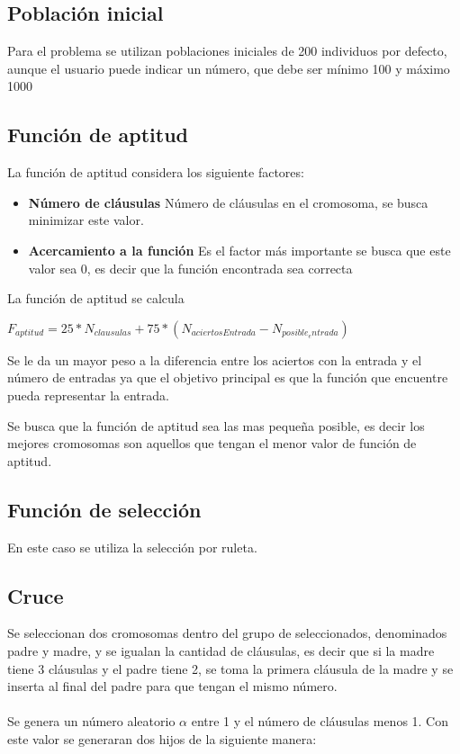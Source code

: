 \documentclass[letter]{article}
\begin{document}
\subsection{Población inicial}

Para el problema se utilizan poblaciones iniciales de 200 individuos por defecto, aunque el usuario puede indicar un número, que debe ser mínimo 100 y máximo 1000

\subsection{Función de aptitud}

La función de aptitud considera los siguiente factores:

\begin{itemize}
	\item \textbf{Número de cláusulas} Número de cláusulas en el cromosoma, se busca minimizar este valor.
	\item \textbf{Acercamiento a la función} Es el factor más importante se busca que este valor sea 0, es decir que la función encontrada sea correcta
\end{itemize}

La función de aptitud se calcula

$F_{aptitud}=25*N_{clausulas} + 75*(N_{aciertosEntrada} - N_{posible_entrada})$

Se le da un mayor peso a la diferencia entre los aciertos con la entrada y el número de entradas ya que el objetivo principal es que la función que encuentre pueda representar la entrada.

Se busca que la función de aptitud sea las mas pequeña posible, es decir los mejores cromosomas son aquellos que tengan el menor valor de función de aptitud.

\subsection{Función de selección}

En este caso se utiliza la selección por ruleta.

\subsection{Cruce}

Se seleccionan dos cromosomas dentro del grupo de seleccionados, denominados padre y madre, y se igualan la cantidad de cláusulas, es decir que si la madre tiene 3 cláusulas y el padre tiene 2, se toma la primera cláusula de la madre y se inserta al final del padre para que tengan el mismo número.
\\\\
Se genera un número aleatorio $\alpha$ entre 1 y el número de cláusulas menos 1. Con este valor se generaran dos hijos de la siguiente manera:
\end{document}
